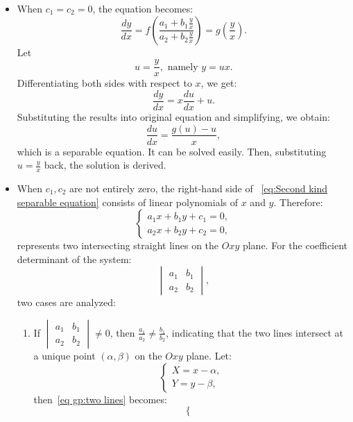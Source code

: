 \documentclass[11pt]{elegantbook}
\begin{document}
\begin{itemize}
    \item  When \(c_1 = c_2 = 0\), the equation becomes:  
        \[
        \frac{dy}{dx} = f\left(\frac{a_1 + b_1 \frac{y}{x}}{a_2 + b_2 \frac{y}{x}}\right) = g\left(\frac{y}{x}\right).
        \]
        Let
        \[
        u = \frac{y}{x}, \text{ namely } y = ux. 
        \]
        Differentiating both sides with respect to \(x\), we get:
        \[
        \frac{dy}{dx} = x \frac{du}{dx} + u.
        \]
        Substituting the results into original equation and simplifying, we obtain:
        \[
        \frac{du}{dx} = \frac{g(u) - u}{x},
        \]
        which is a separable equation. 
        It can be solved easily. 
        Then, substituting \(u = \frac{y}{x}\) back, the solution is derived.
    \item When \(c_1, c_2\) are not entirely zero, the right-hand side of ~\eqref{eq:Second kind separable equation} 
        consists of linear polynomials of \(x\) and \(y\). Therefore:
        \[
        \begin{cases}\label{eq gp:two lines}
        a_1x + b_1y + c_1 = 0, \\
        a_2x + b_2y + c_2 = 0,
        \end{cases}
        \]
        represents two intersecting straight lines on the \(Oxy\) plane. For the coefficient determinant of the system:
        \[
        \begin{vmatrix}
        a_1 & b_1 \\
        a_2 & b_2
        \end{vmatrix},
        \]
        two cases are analyzed:
        \begin{enumerate}
            \item  If \(\begin{vmatrix} a_1 & b_1 \\ a_2 & b_2 \end{vmatrix} \neq 0\), 
                then \(\frac{a_1}{a_2} \neq \frac{b_1}{b_2}\), 
                indicating that the two lines intersect at a unique point \((\alpha, \beta)\) on the \(Oxy\) plane. 
                Let:
                \[
                \begin{cases}
                X = x - \alpha, \\
                Y = y - \beta,
                \end{cases}
                \]
                then~\eqref{eq gp:two lines} becomes:
                \[
                \begin{cases}

\end{cases}\]
\end{enumerate}
\end{itemize}
\end{document}
